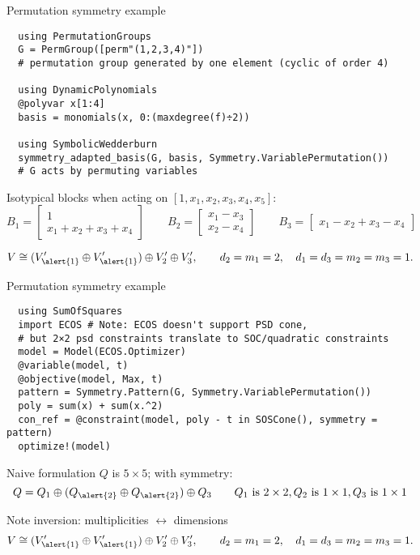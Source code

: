 \begin{frame}[fragile]{Permutation symmetry example}
\footnotesize
\begin{verbatim}
  using PermutationGroups
  G = PermGroup([perm"(1,2,3,4)"])
  # permutation group generated by one element (cyclic of order 4)

  using DynamicPolynomials
  @polyvar x[1:4]
  basis = monomials(x, 0:(maxdegree(f)÷2))

  using SymbolicWedderburn
  symmetry_adapted_basis(G, basis, Symmetry.VariablePermutation())
  # G acts by permuting variables
\end{verbatim}

Isotypical blocks when acting on $[1, x_1, x_2, x_3, x_4, x_5]$:
\[
  B_1 = \begin{bmatrix}
          1\\
          x_1 + x_2 + x_3 + x_4
        \end{bmatrix}
  \qquad
  B_2 = \begin{bmatrix}
          x_1 - x_3\\
          x_2 - x_4
        \end{bmatrix}
  \qquad
  B_3 = \begin{bmatrix}
          x_1 - x_2 + x_3 - x_4
        \end{bmatrix}
\]

  \[V \cong (V_{\alert{1}}' \oplus V_{\alert{1}}') \oplus V_2' \oplus V_3', \qquad d_2 = m_1 = 2, \quad d_1 = d_3 = m_2 = m_3 = 1.\]
\end{frame}

\begin{frame}[fragile]{Permutation symmetry example}
\footnotesize
\begin{verbatim}
  using SumOfSquares
  import ECOS # Note: ECOS doesn't support PSD cone,
  # but 2×2 psd constraints translate to SOC/quadratic constraints
  model = Model(ECOS.Optimizer)
  @variable(model, t)
  @objective(model, Max, t)
  pattern = Symmetry.Pattern(G, Symmetry.VariablePermutation())
  poly = sum(x) + sum(x.^2)
  con_ref = @constraint(model, poly - t in SOSCone(), symmetry = pattern)
  optimize!(model)
\end{verbatim}

\normalsize

Naive formulation $Q$ is $5\times 5$; with symmetry:
  \[ Q = Q_1 \oplus (Q_{\alert{2}} \oplus Q_{\alert{2}}) \oplus Q_3 \qquad Q_1 \text{ is }2\times 2, Q_2 \text{ is }1\times 1, Q_3 \text{ is }1\times 1 \]

  Note inversion: multiplicities $\leftrightarrow$ dimensions
  \[V \cong (V_{\alert{1}}' \oplus V_{\alert{1}}') \oplus V_2' \oplus V_3', \qquad d_2 = m_1 = 2, \quad d_1 = d_3 = m_2 = m_3 = 1.\]

\end{frame}

